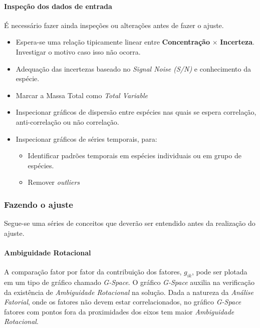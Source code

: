 \paragraph{Inspeção dos dados de entrada}

É necessário fazer ainda inspeções ou alterações antes de fazer o ajuste.
\begin{itemize}
  \item Espera-se uma relação tipicamente linear entre 
        \textbf{Concentração} $\times$ \textbf{Incerteza}.  
        Investigar o motivo caso isso não ocorra. 
  \item Adequação das incertezas baseado no \textit{Signal Noise (S/N)} e 
        conhecimento da espécie. 
  \item Marcar a Massa Total como \textit{Total Variable}
  \item Inspecionar gráficos de dispersão entre espécies nas quais se espera 
        correlação, anti-correlação ou não correlação. 
  \item Inspecionar gráficos de séries temporais, para:
    \begin{itemize}
      \item Identificar padrões temporais em espécies individuais ou em grupo 
            de espécies.
      \item Remover \textit{outliers} 
    \end{itemize}
\end{itemize}

\subsubsection{Fazendo o ajuste}

Segue-se uma séries de conceitos que deverão ser entendido antes da realização 
do ajuste. 

\paragraph{Ambiguidade Rotacional}

A comparação fator por fator da contribuição dos fatores, $g_{ik}$, 
pode ser plotada em um tipo de gráfico chamado \textit{G-Space}. 
O gráfico \textit{G-Space} auxilia na verificação da existência de 
\textit{Ambiguidade Rotacional} na solução. 
Dada a natureza da \textit{Análise Fatorial}, onde os fatores não devem estar 
correlacionados, no gráfico \textit{G-Space} fatores com pontos fora da 
proximidades dos eixos tem maior \textit{Ambiguidade Rotacional}. 

